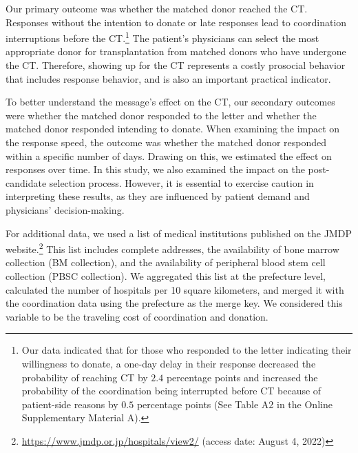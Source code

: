 \documentclass[12pt, a4paper]{article}
\begin{document}
Our primary outcome was whether the matched donor reached the CT. Responses without the intention to donate or late responses lead to coordination interruptions before the CT.\footnote{Our data indicated that for those who responded to the letter indicating their willingness to donate, a one-day delay in their response decreased the probability of reaching CT by \(2.4\) percentage points and increased the probability of the coordination being interrupted before CT because of patient-side reasons by \(0.5\) percentage points (See Table A2 in the Online Supplementary Material A).} The patient's physicians can select the most appropriate donor for transplantation from matched donors who have undergone the CT. Therefore, showing up for the CT represents a costly prosocial behavior that includes response behavior, and is also an important practical indicator.

To better understand the message's effect on the CT, our secondary outcomes were whether the matched donor responded to the letter and whether the matched donor responded intending to donate. When examining the impact on the response speed, the outcome was whether the matched donor responded within a specific number of days. Drawing on this, we estimated the effect on responses over time. In this study, we also examined the impact on the post-candidate selection process. However, it is essential to exercise caution in interpreting these results, as they are influenced by patient demand and physicians' decision-making.

For additional data, we used a list of medical institutions published on the JMDP website.\footnote{\url{https://www.jmdp.or.jp/hospitals/view2/} (access date: August 4, 2022)} This list includes complete addresses, the availability of bone marrow collection (BM collection), and the availability of peripheral blood stem cell collection (PBSC collection). We aggregated this list at the prefecture level, calculated the number of hospitals per 10 square kilometers, and merged it with the coordination data using the prefecture as the merge key. We considered this variable to be the traveling cost of coordination and donation.
\end{document}
